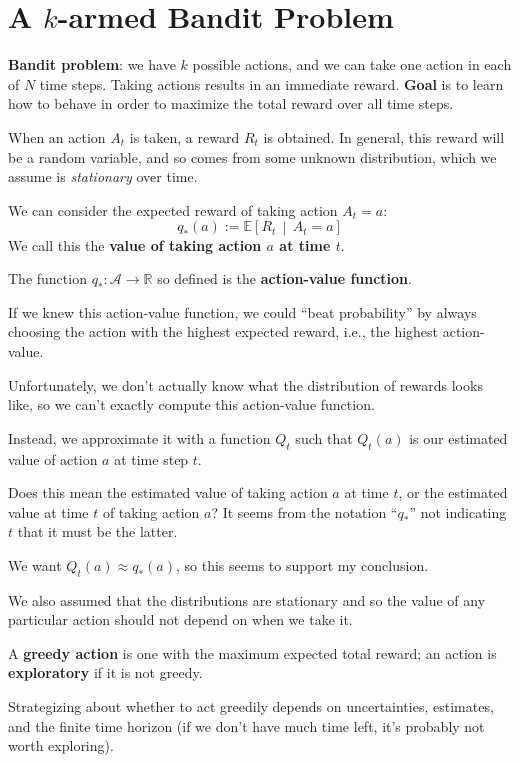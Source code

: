 \section{A $k$-armed Bandit Problem}
\bit
	\item \textbf{Bandit problem}: we have $k$ possible actions, and we can take one action in each of $N$ time steps. Taking actions results in an immediate reward. \textbf{Goal} is to learn how to behave in order to maximize the total reward over all time steps.
	\item When an action $A_t$ is taken, a reward $R_t$ is obtained. In general, this reward will be a random variable, and so comes from some unknown distribution, which we assume is \textit{stationary} over time.
	\bit	
		\item We can consider the expected reward of taking action $A_t = a$: 
		\begin{equation}
		q_*\left(a\right) := \mathbb{E}\left[R_t \, \middle| \, A_t = a\right]
		\end{equation}
		We call this the \textbf{value of taking action $a$ at time $t$}.
		\item The function $q_*: \mathcal{A} \rightarrow \mathbb{R}$ so defined is the \textbf{action-value function}.
	\eit
	\item If we knew this action-value function, we could ``beat probability'' by always choosing the action with the highest expected reward, i.e., the highest action-value.
	\item Unfortunately, we don't actually know what the distribution of rewards looks like, so we can't exactly compute this action-value function.
	\bit
		\item Instead, we approximate it with a function $Q_t$ such that $Q_t\left(a\right)$ is our estimated value of action $a$ at time step $t$.
		\bit
			\item Does this mean the estimated value of taking action $a$ at time $t$, or the estimated value at time $t$ of taking action $a$? It seems from the notation ``$q_*$'' not indicating $t$ that it must be the latter.
			\item We want $Q_t\left(a\right) \approx q_*\left(a\right)$, so this seems to support my conclusion.
			\item We also assumed that the distributions are stationary and so the value of any particular action should not depend on when we take it.
		\eit
	\eit
	\item A \textbf{greedy action} is one with the maximum expected total reward; an action is \textbf{exploratory} if it is not greedy.
	\item Strategizing about whether to act greedily depends on uncertainties, estimates, and the finite time horizon (if we don't have much time left, it's probably not worth exploring).
	
